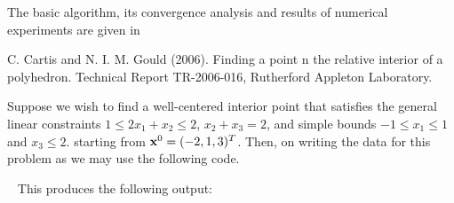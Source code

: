 \documentclass{galahad}
\begin{document}
\vspace*{1mm}

\galreferences
\vspace*{1mm}

\noindent
The basic algorithm, its convergence analysis and results of
numerical experiments are given in
\vspace*{1mm}

\noindent
C. Cartis and N. I. M. Gould (2006).
Finding a point n the relative interior of a polyhedron.
Technical Report TR-2006-016, Rutherford Appleton Laboratory.


\galexample
Suppose we wish to find a well-centered interior point
that satisfies the general linear constraints
$1 \leq  2 x_{1}  +  x_{2}  \leq  2$, 
$x_{2}  +  x_{3}  =  2$, and simple bounds
$-1  \leq  x_{1}  \leq  1$ and $x_{3}  \leq  2$.
starting from ${\mathbf{x}}^{0}  =  ( -2, 1, 3 )^{T}$.
Then, on writing the data for this problem as
we may use the following code.

{\tt \small
\VerbatimInput{\packageexample}
}
\noindent
This produces the following output:
{\tt \small
\VerbatimInput{\packageresults}
}
\end{document}
